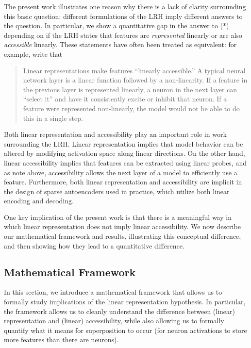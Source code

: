 \documentclass[11pt]{article}
\begin{document}
The present work illustrates one reason why there is a lack of clarity surrounding this basic question: different formulations of the LRH imply different answers to the question. In particular, we show a quantitative gap in the answer to (*) depending on if the LRH states that features are \textit{represented} linearly or are also \textit{accessible} linearly. These statements have often been treated as equivalent: for example, \cite{elhage2022toy} write that
\begin{quote}
    Linear representations make features ``linearly accessible.'' A typical neural network layer is a linear function followed by a non-linearity. If a feature in the previous layer is represented linearly, a neuron in the next layer can ``select it'' and have it consistently excite or inhibit that neuron. If a feature were represented non-linearly, the model would not be able to do this in a single step.
\end{quote}
Both linear representation and accessibility play an important role in work surrounding the LRH. Linear representation implies that model behavior can be altered by modifying activation space along linear directions. On the other hand, linear accessibility implies that features can be extracted using linear probes, and as \cite{elhage2022toy} note above, accessibility allows the next layer of a model to efficiently use a feature. Furthermore, both linear representation and accessibility are implicit in the design of sparse autoencoders used in practice, which utilize both linear encoding and decoding.

One key implication of the present work is that there is a meaningful way in which linear representation does not imply linear accessibility. We now describe our mathematical framework and results, illustrating this conceptual difference, and then showing how they lead to a quantitative difference.





\subsection{Mathematical Framework}
In this section, we introduce a mathematical framework that allows us to formally study implications of the linear representation hypothesis. In particular, the framework allows us to cleanly understand the difference between (linear) representation and (linear) accessibility, while also allowing us to formally quantify what it means for superposition to occur (for neuron activations to store more features than there are neurons).
\end{document}
